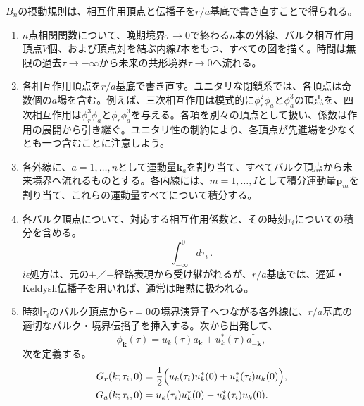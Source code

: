 \documentclass[a4paper,11pt,oneside]{article}
\theoremstyle{definition}
\numberwithin{equation}{section}
\begin{document}
\(B_n\)の摂動規則は、相互作用頂点と伝播子を\(r/a\)基底で書き直すことで得られる。
\begin{enumerate}
\item
\(n\)点相関関数について、晩期境界\(\tau\to 0\)で終わる\(n\)本の外線、バルク相互作用頂点\(V\)個、および頂点対を結ぶ内線\(I\)本をもつ、すべての図を描く。時間は無限の過去\(\tau\to-\infty\)から未来の共形境界\(\tau\to 0\)へ流れる。



\item
各相互作用頂点を\(r/a\)基底で書き直す。ユニタリな閉鎖系では、各頂点は奇数個の\(a\)場を含む。例えば、三次相互作用は模式的に$ \phi_r^2\phi_a  $と$  \phi_a^3 $の頂点を、四次相互作用は$ \phi_r^3\phi_a  $と$ \phi_r\phi_a^3 $を与える。各項を別々の頂点として扱い、係数は作用の展開から引き継ぐ。ユニタリ性の制約により、各頂点が先進場を少なくとも一つ含むことに注意しよう。



\item
各外線に、\(a=1,\dots,n\)として運動量\(\mathbf k_a\)を割り当て、すべてバルク頂点から未来境界へ流れるものとする。各内線には、\(m=1,\dots,I\)として積分運動量\(\mathbf p_m\)を割り当て、これらの運動量すべてについて積分する。



\item
各バルク頂点について、対応する相互作用係数と、その時刻\(\tau_i\)についての積分を含める。
\begin{equation}
\int_{-\infty}^{0} d\tau_i \, .
\end{equation}
\(i\epsilon\)処方は、元の\(+\)／\(-\)経路表現から受け継がれるが、\(r/a\)基底では、遅延・Keldysh伝播子を用いれば、通常は暗黙に扱われる。



\item
時刻\(\tau_i\)のバルク頂点から\(\tau=0\)の境界演算子へつながる各外線に、\(r/a\)基底の適切なバルク・境界伝播子を挿入する。次から出発して、
\begin{equation}
\phi_{\mathbf k}(\tau)=u_k(\tau)a_{\mathbf k}+u_k^*(\tau)a^\dagger_{-\mathbf k},
\end{equation}
次を定義する。
\begin{align}
G_r(k;\tau_i,0)
&=
\frac12\Bigl(u_k(\tau_i)u_k^*(0)+u_k^*(\tau_i)u_k(0)\Bigr), \\
G_a(k;\tau_i,0)
&=
u_k(\tau_i)u_k^*(0)-u_k^*(\tau_i)u_k(0) .
\end{align}



\end{enumerate}
\end{document}
